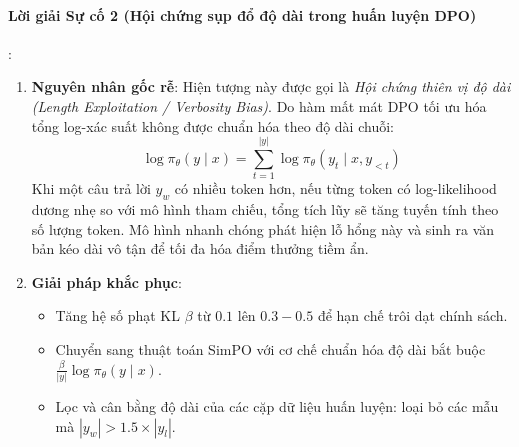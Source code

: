 \paragraph{Lời giải Sự cố 2 (Hội chứng sụp đổ độ dài trong huấn luyện DPO)}:
\begin{enumerate}
  \item \textbf{Nguyên nhân gốc rễ}:
  Hiện tượng này được gọi là \textit{Hội chứng thiên vị độ dài (Length Exploitation / Verbosity Bias)}. Do hàm mất mát DPO tối ưu hóa tổng log-xác suất không được chuẩn hóa theo độ dài chuỗi:
  \begin{equation*}
  \log \pi_\theta(y \mid x) = \sum_{t=1}^{|y|} \log \pi_\theta(y_t \mid x, y_{<t})
  \end{equation*}
  Khi một câu trả lời $y_w$ có nhiều token hơn, nếu từng token có log-likelihood dương nhẹ so với mô hình tham chiếu, tổng tích lũy sẽ tăng tuyến tính theo số lượng token. Mô hình nhanh chóng phát hiện lỗ hổng này và sinh ra văn bản kéo dài vô tận để tối đa hóa điểm thưởng tiềm ẩn.
  \item \textbf{Giải pháp khắc phục}:
  \begin{itemize}
    \item Tăng hệ số phạt KL $\beta$ từ $0.1$ lên $0.3 - 0.5$ để hạn chế trôi dạt chính sách.
    \item Chuyển sang thuật toán SimPO với cơ chế chuẩn hóa độ dài bắt buộc $\frac{\beta}{|y|} \log \pi_\theta(y \mid x)$.
    \item Lọc và cân bằng độ dài của các cặp dữ liệu huấn luyện: loại bỏ các mẫu mà $|y_w| > 1.5 \times |y_l|$.
  \end{itemize}
\end{enumerate}

